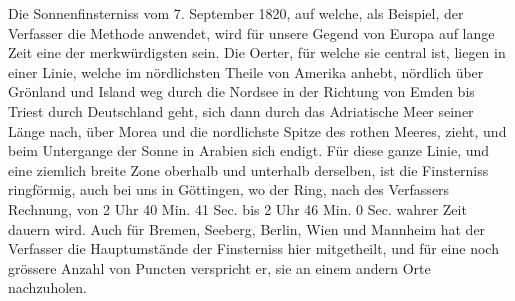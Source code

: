 Die Sonnenfinsterniss vom 7. September 1820, auf welche, als Beispiel, der Verfasser die Methode anwendet, wird für unsere Gegend von Europa auf lange Zeit eine der merkwürdigsten sein. Die Oerter, für welche sie central ist, liegen in einer Linie, welche im nördlichsten Theile von Amerika anhebt, nördlich über Grönland und Island weg durch die Nordsee in der Richtung von Emden bis Triest durch Deutschland geht, sich dann durch das Adriatische Meer seiner Länge nach, über Morea und die nordlichste Spitze des rothen Meeres, zieht, und beim Untergange der Sonne in Arabien sich endigt. Für diese ganze Linie, und eine ziemlich breite Zone oberhalb und unterhalb derselben, ist die Finsterniss ringförmig, auch bei uns in Göttingen, wo der Ring, nach des Verfassers Rechnung, von 2 Uhr 40 Min. 41 Sec. bis 2 Uhr 46 Min. 0 Sec. wahrer Zeit dauern wird. Auch für Bremen, Seeberg, Berlin, Wien und Mannheim hat der Verfasser die Hauptumstände der Finsterniss hier mitgetheilt, und für eine noch grössere Anzahl von Puncten verspricht er, sie an einem andern Orte nachzuholen.
